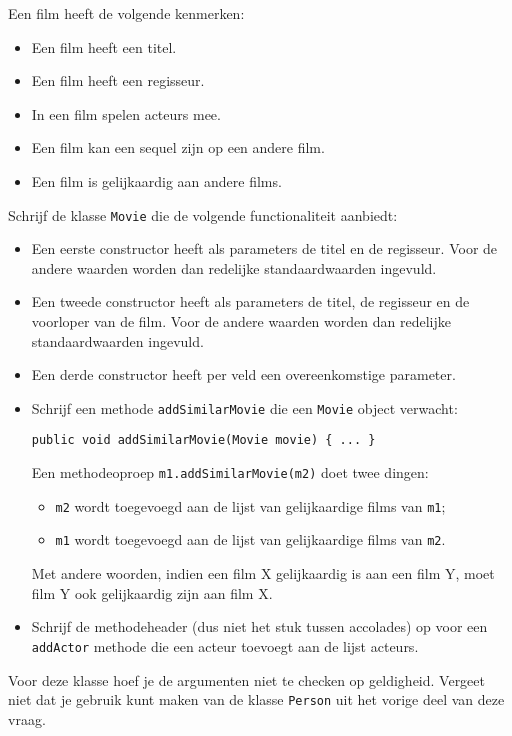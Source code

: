 \documentclass[a4paper,solution]{khltoets}
\begin{document}
\BEGINASSIGNMENT
Een film heeft de volgende kenmerken:
\begin{itemize}
  \item Een film heeft een titel.
  \item Een film heeft een regisseur.
  \item In een film spelen acteurs mee.
  \item Een film kan een sequel zijn op een andere film.
  \item Een film is gelijkaardig aan andere films.
\end{itemize}
Schrijf de klasse {\tt Movie} die de volgende functionaliteit aanbiedt:
\begin{itemize}
  \item Een eerste constructor heeft als parameters de titel en de regisseur. Voor de andere
        waarden worden dan redelijke standaardwaarden ingevuld.
  \item Een tweede constructor heeft als parameters de titel, de regisseur en de voorloper van de film.
        Voor de andere waarden worden dan redelijke standaardwaarden ingevuld.
  \item Een derde constructor heeft per veld een overeenkomstige parameter.
  \item Schrijf een methode {\tt addSimilarMovie} die een {\tt Movie} object verwacht:
        \begin{center} \tt public void addSimilarMovie(Movie movie) \{ ... \} \end{center}
        Een methodeoproep {\tt m1.addSimilarMovie(m2)} doet twee dingen:
        \begin{itemize}
          \item {\tt m2} wordt toegevoegd aan de lijst van gelijkaardige films van {\tt m1};
          \item {\tt m1} wordt toegevoegd aan de lijst van gelijkaardige films van {\tt m2}.
        \end{itemize}
        Met andere woorden, indien een film X gelijkaardig is aan een film Y, moet
        film Y ook gelijkaardig zijn aan film X.
  \item Schrijf de methodeheader (dus niet het stuk tussen accolades) op voor een {\tt addActor} methode die een acteur
        toevoegt aan de lijst acteurs.
\end{itemize}
Voor deze klasse hoef je de argumenten niet te checken op geldigheid. Vergeet niet dat je gebruik kunt maken van de klasse
{\tt Person} uit het vorige deel van deze vraag.
\ENDASSIGNMENT
\end{document}

